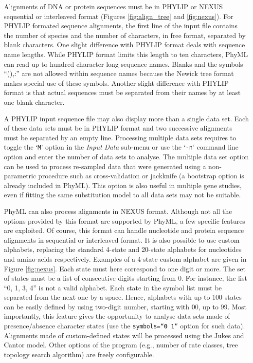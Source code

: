\documentclass[a4paper,12pt]{article}
\newcommand{\x}[1]{\texttt{#1}}
\begin{document}
Alignments   of   DNA   or   protein   sequences   must  be   in   PHYLIP   or   NEXUS
\cite{maddison97} sequential or interleaved format
(Figures \ref{fig:align_tree}  and \ref{fig:nexus}).  For  PHYLIP formated sequence  alignments, the
first line of  the input file contains the number  of species and the number  of characters, in free
format, separated by blank characters.  One slight difference with PHYLIP format deals with sequence
name  lengths.  While PHYLIP  format limits  this length  to ten  characters, PhyML  can read  up to
hundred  character long sequence  names.  Blanks  and the  symbols ``(),:''  are not  allowed within
sequence names because  the Newick tree format  makes special use of these  symbols.  Another slight
difference with  PHYLIP format is  that actual sequences  must be separated  from their names  by at
least one blank character.

A PHYLIP input sequence file  may also display more than a single data set.  Each of these data sets
must  be  in  PHYLIP   format  and  two  successive  alignments  must  be   separated  by  an  empty
line. Processing multiple  data sets requires to toggle  the `\x{M}' option in the  {\em Input Data}
sub-menu or use the `\x{-n}' command line option  and enter the number of data sets to analyse.  The
multiple  data set  option can  be  used to  process re-sampled  data  that were  generated using  a
non-parametric  procedure such  as  cross-validation or  jackknife  (a bootstrap  option is  already
included in PhyML).  This  option is also useful in multiple gene studies,  even if fitting the same
substitution model to all data sets may not be suitable.

PhyML can  also process alignments in  NEXUS format. Although not  all the options  provided by this
format are supported  by PhyML, a few specific  features are exploited.  Of course,  this format can
handle nucleotide and  protein sequence alignments in sequential or interleaved  format.  It is also
possible  to  use custom  alphabets,  replacing  the standard  4-state  and  20-state alphabets  for
nucleotides and amino-acids respectively. Examples of  a 4-state custom alphabet are given in Figure
\ref{fig:nexus}. Each state must  here correspond to one digit or more. The set  of states must be a
list of consecutive  digits starting from 0.  For instance,  the list ``0, 1, 3, 4''  is not a valid
alphabet. Each  state in the  symbol list  must be separated  from the next  one by a  space. Hence,
alphabets with up to  100 states can be easily defined by using  two-digit number, starting with 00,
up  to 99.   Most importantly,  this feature  gives the  opportunity to  analyse data  sets  made of
presence/absence   character   states   (use   the   \texttt{symbols=``0  1''}   option   for   such
data). Alignments made of custom-defined states will be processed using the
Jukes and Cantor model.   Other options of the program (e.g., number  of rate classes, tree topology
search algorithm) are freely configurable.
\end{document}
